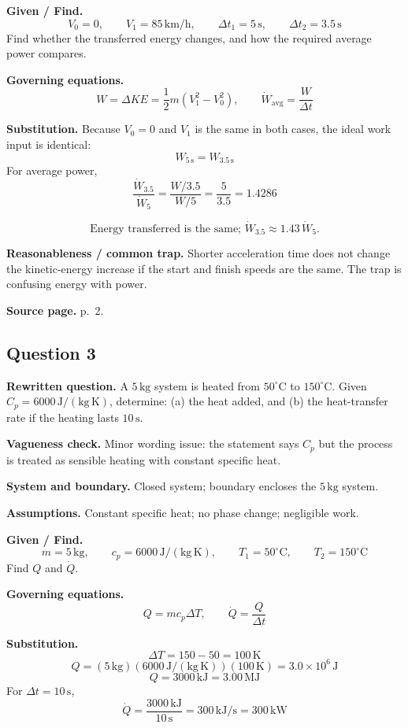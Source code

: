 \textbf{Given / Find.}
\[
V_0=0,\qquad V_1=85\,\mathrm{km/h},\qquad \Delta t_1=5\,\mathrm{s},\qquad \Delta t_2=3.5\,\mathrm{s}
\]
Find whether the transferred energy changes, and how the required average power compares.

\textbf{Governing equations.}
\[
W=\Delta KE=\frac12 m\left(V_1^2-V_0^2\right),
\qquad
\dot W_{\mathrm{avg}}=\frac{W}{\Delta t}
\]

\textbf{Substitution.}
Because $V_0=0$ and $V_1$ is the same in both cases, the ideal work input is identical:
\[
W_{5\,\mathrm{s}}=W_{3.5\,\mathrm{s}}
\]
For average power,
\[
\frac{\dot W_{3.5}}{\dot W_{5}}=\frac{W/3.5}{W/5}=\frac{5}{3.5}=1.4286
\]

\[\boxed{\text{Energy transferred is the same; }\dot W_{3.5}\approx1.43\,\dot W_{5}.}\]

\textbf{Reasonableness / common trap.} Shorter acceleration time does not change the kinetic-energy increase if the start and finish speeds are the same. The trap is confusing energy with power.

\textbf{Source page.} p.~2.

\subsection*{Question 3}
\textbf{Rewritten question.} A $5\,\mathrm{kg}$ system is heated from $50^\circ\mathrm{C}$ to $150^\circ\mathrm{C}$. Given $C_p=6000\,\mathrm{J/(kg\,K)}$, determine: (a) the heat added, and (b) the heat-transfer rate if the heating lasts $10\,\mathrm{s}$.

\textbf{Vagueness check.} Minor wording issue: the statement says $C_p$ but the process is treated as sensible heating with constant specific heat.

\textbf{System and boundary.} Closed system; boundary encloses the $5\,\mathrm{kg}$ system.

\textbf{Assumptions.} Constant specific heat; no phase change; negligible work.

\textbf{Given / Find.}
\[
m=5\,\mathrm{kg},\qquad c_p=6000\,\mathrm{J/(kg\,K)},\qquad T_1=50^\circ\mathrm{C},\qquad T_2=150^\circ\mathrm{C}
\]
Find $Q$ and $\dot Q$.

\textbf{Governing equations.}
\[
Q=mc_p\Delta T,\qquad \dot Q=\frac{Q}{\Delta t}
\]

\textbf{Substitution.}
\[
\Delta T=150-50=100\,\mathrm{K}
\]
\[
Q=(5\,\mathrm{kg})(6000\,\mathrm{J/(kg\,K)})(100\,\mathrm{K})=3.0\times10^6\,\mathrm{J}
\]
\[
Q=3000\,\mathrm{kJ}=3.00\,\mathrm{MJ}
\]
For $\Delta t=10\,\mathrm{s}$,
\[
\dot Q=\frac{3000\,\mathrm{kJ}}{10\,\mathrm{s}}=300\,\mathrm{kJ/s}=300\,\mathrm{kW}
\]

